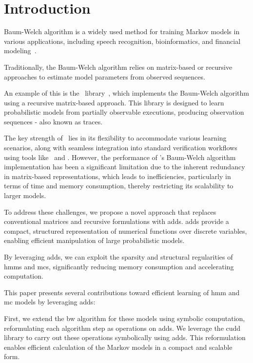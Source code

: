 
\section{Introduction}\label{sec:introduction}
 Baum-Welch algorithm is a widely used method for training Markov models in various applications, including speech recognition, bioinformatics, and financial modeling~\cite{chavan2013overview,ciocchetta2009bio,mamon2007hidden}.

Traditionally, the Baum-Welch algorithm relies on matrix-based or recursive approaches to estimate model parameters from observed sequences.

An example of this is the \Jajapy\ library~\cite{ReynouardIB23}, which implements the Baum-Welch algorithm using a recursive matrix-based approach.
This library is designed to learn probabilistic models from partially observable executions, producing observation sequences - also known as traces.

The key strength of \Jajapy\ lies in its flexibility to accommodate various learning scenarios, along with seamless integration into standard verification workflows using tools like \Storm\ and \Prism.
However, the performance of \Jajapy's Baum-Welch algorithm implementation has been a significant limitation due to the inherent redundancy in matrix-based representations, which leads to inefficiencies, particularly in terms of time and memory consumption, thereby restricting its scalability to larger models.

To address these challenges, we propose a novel approach that replaces conventional matrices and recursive formulations with \glspl{add}.
\glspl{add} provide a compact, structured representation of numerical functions over discrete variables, enabling efficient manipulation of large probabilistic models.

By leveraging \glspl{add}, we can exploit the sparsity and structural regularities of \glspl{hmm} and \glspl{mc}, significantly reducing memory consumption and accelerating computation.

This paper presents several contributions toward efficient learning of \gls{hmm} and \gls{mc} models by leveraging \glspl{add}:

First, we extend the \gls{bw} algorithm for these models using symbolic computation, reformulating each algorithm step as operations on \glspl{add}.
We leverage the \gls{cudd} library to carry out these operations symbolically using \glspl{add}.
This reformulation enables efficient calculation of the Markov models in a compact and scalable form.

